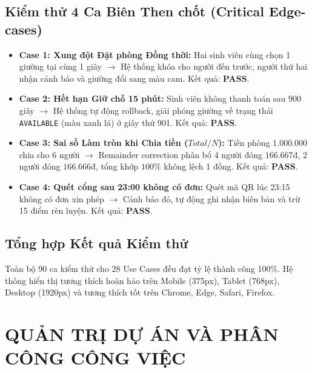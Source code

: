 \documentclass[12pt,a4paper,oneside]{report}
\begin{document}
\section{Kiểm thử 4 Ca Biên Then chốt (Critical Edge-cases)}
\begin{itemize}
    \item \textbf{Case 1: Xung đột Đặt phòng Đồng thời:} Hai sinh viên cùng chọn 1 giường tại cùng 1 giây $\rightarrow$ Hệ thống khóa cho người đến trước, người thứ hai nhận cảnh báo và giường đổi sang màu cam. Kết quả: \textbf{PASS}.
    \item \textbf{Case 2: Hết hạn Giữ chỗ 15 phút:} Sinh viên không thanh toán sau 900 giây $\rightarrow$ Hệ thống tự động rollback, giải phóng giường về trạng thái \texttt{AVAILABLE} (màu xanh lá) ở giây thứ 901. Kết quả: \textbf{PASS}.
    \item \textbf{Case 3: Sai số Làm tròn khi Chia tiền ($Total / N$):} Tiền phòng $1.000.000$ chia cho 6 người $\rightarrow$ Remainder correction phân bổ 4 người đóng $166.667$đ, 2 người đóng $166.666$đ, tổng khớp $100\%$ không lệch 1 đồng. Kết quả: \textbf{PASS}.
    \item \textbf{Case 4: Quét cổng sau 23:00 không có đơn:} Quét mã QR lúc 23:15 không có đơn xin phép $\rightarrow$ Cảnh báo đỏ, tự động ghi nhận biên bản và trừ 15 điểm rèn luyện. Kết quả: \textbf{PASS}.
\end{itemize}

\section{Tổng hợp Kết quả Kiểm thử}
Toàn bộ 90 ca kiểm thử cho 28 Use Cases đều đạt tỷ lệ thành công 100\%. Hệ thống hiển thị tương thích hoàn hảo trên Mobile (375px), Tablet (768px), Desktop (1920px) và tương thích tốt trên Chrome, Edge, Safari, Firefox.

\chapter{QUẢN TRỊ DỰ ÁN VÀ PHÂN CÔNG CÔNG VIỆC}
\label{ch:project_management}
\end{document}
